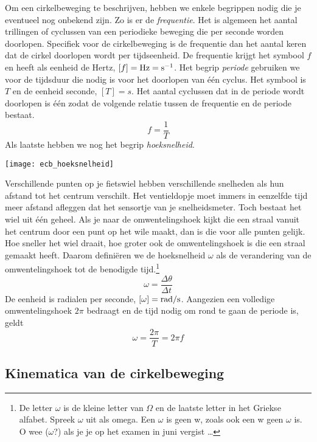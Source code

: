 \documentclass{ximera}
\begin{document}
Om een cirkelbeweging te beschrijven, hebben we enkele begrippen nodig die je eventueel nog onbekend zijn. Zo is er de \emph{frequentie}. Het is algemeen het aantal trillingen of cyclussen van een periodieke beweging die per seconde worden doorlopen. Specifiek voor de cirkelbeweging is de frequentie dan het aantal keren dat de cirkel doorlopen wordt per tijdseenheid. De frequentie krijgt het symbool $f$ en heeft als eenheid de Hertz, $[f]=\rm Hz=s^{-1}$. Het begrip \emph{periode} gebruiken we voor de tijdsduur die nodig is voor het doorlopen van \'e\'en cyclus. Het symbool is $T$ en de eenheid seconde, $[T]=s$. Het aantal cyclussen dat in de periode wordt doorlopen is \'e\'en zodat de volgende relatie tussen de frequentie en de periode bestaat.
\begin{equation*}
	f=\frac{1}{T}
\end{equation*}
Als laatste hebben we nog het begrip \emph{hoeksnelheid}. 
\begin{image}
	\texttt{[image: ecb\_hoeksnelheid]}
\end{image}
Verschillende punten op je fietswiel hebben verschillende snelheden als hun afstand tot het centrum verschilt. Het ventieldopje moet immers in eenzelfde tijd meer afstand afleggen dat het sensortje van je snelheidsmeter. Toch bestaat het wiel uit \'e\'en geheel. Als je naar de omwentelingshoek kijkt die een straal vanuit het centrum door een punt op het wile maakt, dan is die voor alle punten gelijk. Hoe sneller het wiel draait, hoe groter ook de omwentelingshoek is die een straal gemaakt heeft. Daarom defini\"eren we de hoeksnelheid $\omega$ als de verandering van de omwentelingshoek tot de benodigde tijd.\footnote{De letter $\omega$ is de kleine letter van $\Omega$ en de laatste letter in het Griekse alfabet. Spreek $\omega$ uit als omega. Een $\omega$ is geen w, zoals ook een w geen $\omega$ is. O wee ($\omega$?) als je je op het examen in juni vergist \ldots}
\begin{equation*}
	\omega=\frac{\Delta\theta}{\Delta t}
\end{equation*}
De eenheid is radialen per seconde, $[\omega]=\rm rad/s$. Aangezien een volledige omwentelingshoek $2\pi$ bedraagt en de tijd nodig om rond te gaan de periode is, geldt
\begin{equation}
	\omega=\frac{2\pi}{T}=2\pi f\label{hoeksnelheid}
\end{equation}

\subsection{Kinematica van de cirkelbeweging}
\end{document}
